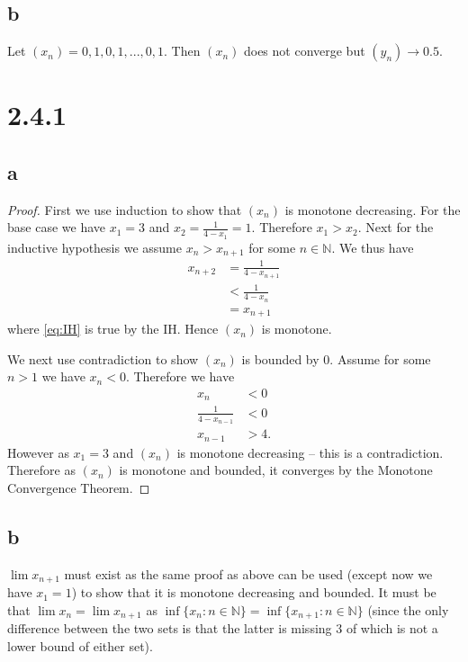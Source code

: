 \documentclass[10pt]{article}
\begin{document}
\subsection*{b}
Let $(x_n) = 0,1,0,1,...,0,1.$ Then $(x_n)$ does not converge but $(y_n)\to 0.5.$

\section*{2.4.1}
\subsection*{a}
\begin{proof}
    First we use induction to show that $(x_n)$ is monotone decreasing. For the base case we have $x_1 = 3$ and $x_2 = \frac{1}{4-x_1} = 1.$ Therefore $x_1 > x_2.$ Next for the inductive hypothesis we assume $x_n > x_{n+1}$ for some $n\in\mathbb{N}.$ We thus have
    \begin{align}
        x_{n+2} &= \frac{1}{4-x_{n+1}}\nonumber\\
        &< \frac{1}{4 - x_n} \label{eq:IH}\\
        &= x_{n+1} \nonumber
    \end{align}
    where \eqref{eq:IH} is true by the IH. Hence $(x_n)$ is monotone. 
    
    We next use contradiction to show $(x_n)$ is bounded by $0$. Assume for some $n>1$ we have $x_n < 0.$
    Therefore we have
    \begin{align*}
        x_n &< 0\\
        \frac{1}{4-x_{n-1}} &< 0\\
        x_{n-1} &> 4.
    \end{align*}
    However as $x_1=3$ and $(x_n)$ is monotone decreasing -- this is a contradiction. Therefore as $(x_n)$ is monotone and bounded, it converges by the Monotone Convergence Theorem.
\end{proof}

\subsection*{b}
$\lim x_{n+1}$ must exist as the same proof as above can be used (except now we have $x_1 = 1$) to show that it is monotone decreasing and bounded. It must be that $\lim x_n = \lim x_{n+1}$ as $\inf \{x_n : n\in\mathbb{N}\} = \inf \{x_{n+1} : n\in\mathbb{N}\}$ (since the only difference between the two sets is that the latter is missing $3$ of which is not a lower bound of either set).
\end{document}
